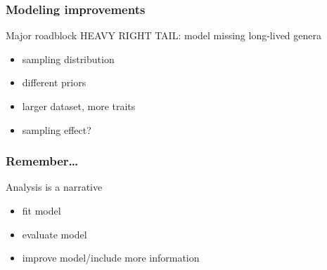 \documentclass{beamer}
\begin{document}
\begin{frame}
  \frametitle{Modeling improvements}

  \begin{alertblock}{Major roadblock}
    \alert{\uppercase{heavy right tail}}: model missing long-lived genera
  \end{alertblock}

  \bigskip

  \begin{itemize}
    \item sampling distribution
    \item different priors
    \item larger dataset, more traits
    \item sampling effect?
  \end{itemize}
\end{frame}

\begin{frame}
  \frametitle{Remember\dots}
  Analysis is a narrative

  \bigskip

  \begin{itemize}
    \item fit model
    \item evaluate model
    \item improve model/include more information
  \end{itemize}
\end{frame}
\end{document}
